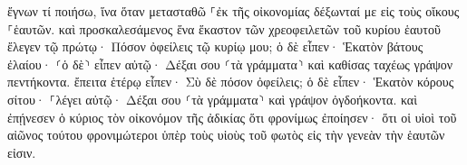 \documentclass{openreader}
\begin{document}
ἔγνων τί ποιήσω, ἵνα ὅταν μετασταθῶ ⸀ἐκ τῆς οἰκονομίας δέξωνταί με εἰς τοὺς οἴκους ⸀ἑαυτῶν. 
καὶ προσκαλεσάμενος ἕνα ἕκαστον τῶν χρεοφειλετῶν τοῦ κυρίου ἑαυτοῦ ἔλεγεν τῷ πρώτῳ· Πόσον ὀφείλεις τῷ κυρίῳ μου; 
ὁ δὲ εἶπεν· Ἑκατὸν βάτους ἐλαίου· ⸂ὁ δὲ⸃ εἶπεν αὐτῷ· Δέξαι σου ⸂τὰ γράμματα⸃ καὶ καθίσας ταχέως γράψον πεντήκοντα. 
ἔπειτα ἑτέρῳ εἶπεν· Σὺ δὲ πόσον ὀφείλεις; ὁ δὲ εἶπεν· Ἑκατὸν κόρους σίτου· ⸀λέγει αὐτῷ· Δέξαι σου ⸂τὰ γράμματα⸃ καὶ γράψον ὀγδοήκοντα. 
καὶ ἐπῄνεσεν ὁ κύριος τὸν οἰκονόμον τῆς ἀδικίας ὅτι φρονίμως ἐποίησεν· ὅτι οἱ υἱοὶ τοῦ αἰῶνος τούτου φρονιμώτεροι ὑπὲρ τοὺς υἱοὺς τοῦ φωτὸς εἰς τὴν γενεὰν τὴν ἑαυτῶν εἰσιν. 
\end{document}
